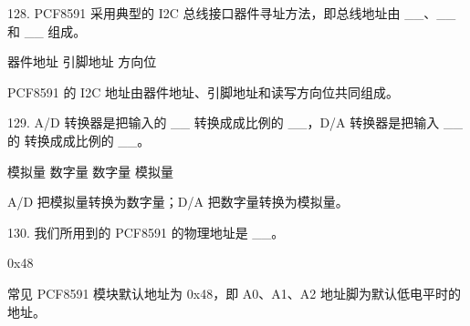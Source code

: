 \begin{question}{128. PCF8591 采用典型的 I2C 总线接口器件寻址方法，即总线地址由 \_\_、\_\_ 和 \_\_ 组成。}
\end{question}
\begin{answer}
器件地址 引脚地址 方向位
\end{answer}
\begin{explanation}
PCF8591 的 I2C 地址由器件地址、引脚地址和读写方向位共同组成。
\end{explanation}

\begin{question}{129. A/D 转换器是把输入的 \_\_ 转换成成比例的 \_\_，D/A 转换器是把输入 \_\_ 的 转换成成比例的 \_\_。}
\end{question}
\begin{answer}
模拟量 数字量 数字量 模拟量
\end{answer}
\begin{explanation}
A/D 把模拟量转换为数字量；D/A 把数字量转换为模拟量。
\end{explanation}

\begin{question}{130. 我们所用到的 PCF8591 的物理地址是 \_\_。}
\end{question}
\begin{answer}
0x48
\end{answer}
\begin{explanation}
常见 PCF8591 模块默认地址为 0x48，即 A0、A1、A2 地址脚为默认低电平时的地址。
\end{explanation}
